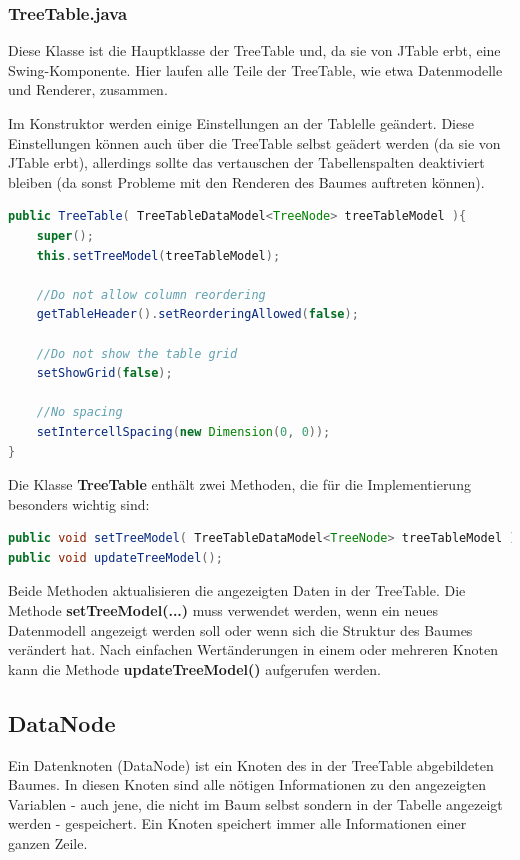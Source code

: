 \subsubsection*{TreeTable.java}
Diese Klasse ist die Hauptklasse der TreeTable und, da sie von JTable erbt, eine Swing-Komponente. Hier laufen alle Teile der TreeTable, wie etwa Datenmodelle und Renderer, zusammen.

Im Konstruktor werden einige Einstellungen an der Tablelle geändert. Diese Einstellungen können auch über die TreeTable selbst geädert werden (da sie von JTable erbt), allerdings sollte das vertauschen der Tabellenspalten deaktiviert bleiben (da sonst Probleme mit den Renderen des Baumes auftreten können).
\begin{lstlisting}[language=JAVA]
public TreeTable( TreeTableDataModel<TreeNode> treeTableModel ){
    super();
    this.setTreeModel(treeTableModel);
        
    //Do not allow column reordering
    getTableHeader().setReorderingAllowed(false);
        
    //Do not show the table grid
    setShowGrid(false);
        
    //No spacing
	setIntercellSpacing(new Dimension(0, 0));
}
\end{lstlisting}

Die Klasse \textbf{TreeTable} enthält zwei Methoden, die für die Implementierung besonders wichtig sind:
\begin{lstlisting}[language=JAVA]
public void setTreeModel( TreeTableDataModel<TreeNode> treeTableModel );
public void updateTreeModel();
\end{lstlisting}

Beide Methoden aktualisieren die angezeigten Daten in der TreeTable. Die Methode \textbf{setTreeModel(...)} muss verwendet werden, wenn ein neues Datenmodell angezeigt werden soll oder wenn sich die Struktur des Baumes verändert hat. Nach einfachen Wertänderungen in einem oder mehreren Knoten kann die Methode \textbf{updateTreeModel()} aufgerufen werden.

\subsection*{DataNode}
Ein Datenknoten (DataNode) ist ein Knoten des in der TreeTable abgebildeten Baumes. In diesen Knoten sind alle nötigen Informationen zu den angezeigten Variablen - auch jene, die nicht im Baum selbst sondern in der Tabelle angezeigt werden - gespeichert. Ein Knoten speichert immer alle Informationen einer ganzen Zeile.

